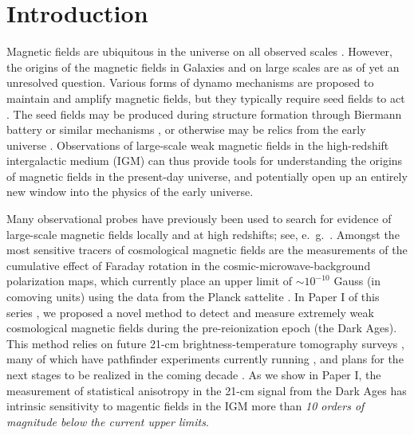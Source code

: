 \section{Introduction}
\label{sec:intro}

Magnetic fields are ubiquitous in the universe on all observed scales \cite{2013A&ARv..21...62D,Vallee04,Neronov10,2005LNP...664...89W,2012SSRv..166..215B}. However, the origins of the magnetic fields in Galaxies and on large scales are as of yet an unresolved question. Various forms of dynamo mechanisms \cite{2013PhRvE..87e3110P} are proposed to maintain and amplify magnetic fields, but they typically require seed fields to act \cite{2013A&ARv..21...62D}. The seed fields may be produced during structure formation through Biermann battery or similar mechanisms \cite{Naoz13,2013PhRvL.111e1303N}, or otherwise may be relics from the early universe \cite{2013A&ARv..21...62D,2012SSRv..166...37W,2014JCAP...05..040K}. Observations of large-scale weak magnetic fields in the high-redshift intergalactic medium (IGM) can thus provide tools for understanding the origins of magnetic fields in the present-day universe, and potentially open up an entirely new window into the physics of the early universe.

Many observational probes have previously been used to search for evidence of large-scale magnetic fields locally and at high redshifts; see, e.~g.~\cite{Yamazaki10,Blasi99,Tavecchio10,Dolag11,2005LNP...664...89W,2014JCAP...01..009K,2013ApJ...770...47K,2014PhRvD..89j3522S,2006MNRAS.372.1060T,2009ApJ...692..236S}. Amongst the most sensitive tracers of cosmological magnetic fields are the measurements of the cumulative effect of Faraday rotation in the cosmic-microwave-background polarization maps, which currently place an upper limit of $\sim$$10^{-10}$ Gauss (in comoving units) using the data from the Planck sattelite \cite{2015arXiv150201594P}. In Paper I of this series \cite{2014arXiv1410.2250V}, we proposed a novel method to detect and measure extremely weak cosmological magnetic fields during the pre-reionization epoch (the Dark Ages). This method relies on future 21-cm brightness-temperature tomography surveys \cite{1997ApJ...475..429M,2004PhRvL..92u1301L}, many of which have pathfinder experiments currently running \cite{2012arXiv1201.1700G,2011AAS...21813206B,2014ApJ...788..106P,2008arXiv0802.1727C,Vanderlinde14,2015AAS...22532803D}, and plans for the next stages to be realized in the coming decade \cite{2008arXiv0802.1727C,2015AAS...22532803D}. As we show in Paper I, the measurement of statistical anisotropy in the 21-cm signal from the Dark Ages has intrinsic sensitivity to magentic fields in the IGM more than \textit{10 orders of magnitude below the current upper limits}. 

